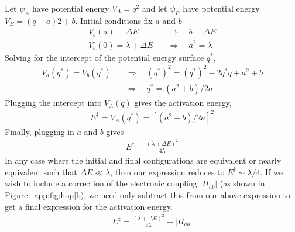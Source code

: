 Let $\psi_A$ have potential energy $V_A = q^2$ and let $\psi_B$ have potential energy $V_B = (q - a) 2 + b$. Initial conditions fix $a$ and $b$
\begin{align}
    V_b(a) = \Delta E \quad &\Rightarrow \quad b = \Delta E \\
    V_b(0) = \lambda + \Delta E \quad &\Rightarrow \quad a^2 = \lambda
\end{align}
Solving for the intercept of the potential energy surface $q^*$,
\begin{align}
    V_a(q^*) = V_b(q^*) \quad &\Rightarrow \quad (q^*)^2 = (q^*)^2 -2q^* q + a^2 +b \\
    &\Rightarrow \quad q^* = (a^2 +b)/2a
\end{align}
Plugging the intercept into $V_A(q)$ gives the activation energy,
\begin{align}
    E^\ddagger = V_A(q^*) = \left[ (a^2 +b)/2a \right]^2
\end{align}
Finally, plugging in $a$ and $b$ gives
\begin{align}
    E^\ddagger = \frac{(\lambda + \Delta E)^2}{4\lambda}
\end{align}
In any case where the initial and final configurations are equivalent or nearly equivalent such that $\Delta E \ll \lambda$, then our expression reduces to $E^\ddagger \sim \lambda/4$. If we wish to include a correction of the electronic coupling $|H_{ab}|$ (as shown in Figure~\ref{app:fig:hop}b), we need only subtract this from our above expression to get a final expression for the activation energy.
\begin{align}
    E^\ddagger = \frac{(\lambda + \Delta E)^2}{4\lambda} - |H_{ab}|
\end{align}

